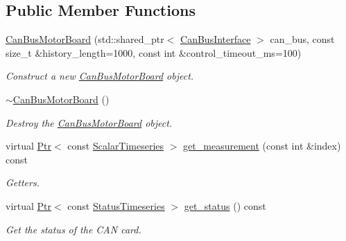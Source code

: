 \subsection*{Public Member Functions}
\begin{DoxyCompactItemize}
\item 
\hyperlink{classblmc__drivers_1_1CanBusMotorBoard_a43674811685fce4dbc3a9996e08454c9}{Can\+Bus\+Motor\+Board} (std\+::shared\+\_\+ptr$<$ \hyperlink{classblmc__drivers_1_1CanBusInterface}{Can\+Bus\+Interface} $>$ can\+\_\+bus, const size\+\_\+t \&history\+\_\+length=1000, const int \&control\+\_\+timeout\+\_\+ms=100)
\begin{DoxyCompactList}\small\item\em Construct a new \hyperlink{classblmc__drivers_1_1CanBusMotorBoard}{Can\+Bus\+Motor\+Board} object. \end{DoxyCompactList}\item 
\mbox{\label{classblmc__drivers_1_1CanBusMotorBoard_a4099ee10765570b2bfb1f91a0670b11b}} 
\hyperlink{classblmc__drivers_1_1CanBusMotorBoard_a4099ee10765570b2bfb1f91a0670b11b}{$\sim$\+Can\+Bus\+Motor\+Board} ()
\begin{DoxyCompactList}\small\item\em Destroy the \hyperlink{classblmc__drivers_1_1CanBusMotorBoard}{Can\+Bus\+Motor\+Board} object. \end{DoxyCompactList}\item 
virtual \hyperlink{classblmc__drivers_1_1MotorBoardInterface_a6a733b7ed7a3a96f6b0712b6bb5307f8}{Ptr}$<$ const \hyperlink{classblmc__drivers_1_1MotorBoardInterface_a14e237254ba495a66091ea3a3a33fa75}{Scalar\+Timeseries} $>$ \hyperlink{classblmc__drivers_1_1CanBusMotorBoard_a0fac258ce65f51074bdb6c64ce8ebded}{get\+\_\+measurement} (const int \&index) const
\begin{DoxyCompactList}\small\item\em Getters. \end{DoxyCompactList}\item 
virtual \hyperlink{classblmc__drivers_1_1MotorBoardInterface_a6a733b7ed7a3a96f6b0712b6bb5307f8}{Ptr}$<$ const \hyperlink{classblmc__drivers_1_1MotorBoardInterface_ae3777e484dda60c4abe87f2b542ddfb8}{Status\+Timeseries} $>$ \hyperlink{classblmc__drivers_1_1CanBusMotorBoard_a7e62dd5126422cfbf587f9c265374fdc}{get\+\_\+status} () const
\begin{DoxyCompactList}\small\item\em Get the status of the C\+AN card. \end{DoxyCompactList}\item 

\end{DoxyCompactItemize}
